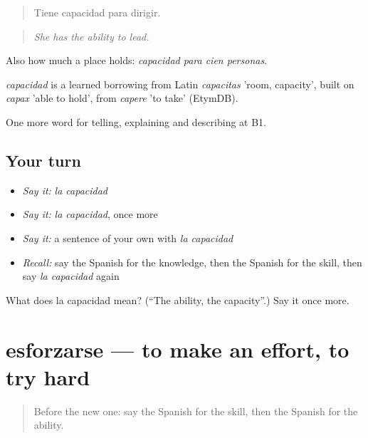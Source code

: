 \begin{quote}
Tiene capacidad para dirigir.
\end{quote}

\begin{quote}
\emph{She has the ability to lead.}
\end{quote}

Also how much a place holds: \emph{capacidad para cien personas}.

\begin{cousinweb}
\emph{capacidad} is a learned borrowing from Latin \emph{capacitas} 'room, capacity', built on \emph{capax} 'able to hold', from \emph{capere} 'to take' (EtymDB).
\end{cousinweb}

\begin{grammarlens}[title={What you've built}]
One more word for telling, explaining and describing at B1.
\end{grammarlens}

\subsection*{Your turn}
\begin{itemize}
\raggedright
  \item \emph{Say it:} \emph{la capacidad}
  \item \emph{Say it:} \emph{la capacidad}, once more
  \item \emph{Say it:} a sentence of your own with \emph{la capacidad}
  \item \emph{Recall:} say the Spanish for the knowledge, then the Spanish for the skill, then say \emph{la capacidad} again
\end{itemize}

\begin{tcolorbox}[breakable,colback=teal!4,colframe=teal!35!black,title={Before you move on}]
What does la capacidad mean? (\textquotedblleft{}The ability, the capacity\textquotedblright{}.) Say it once more.
\end{tcolorbox}
\section[esforzarse]{esforzarse — to make an effort, to try hard}

\label{lesson:ES-C598-esforzarse}



\begin{quote}
Before the new one: say the Spanish for the skill, then the Spanish for the ability.
\end{quote}

